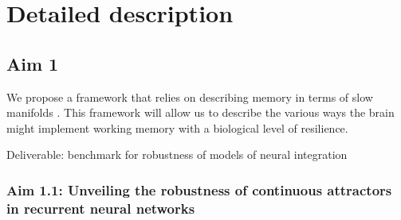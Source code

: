 \documentclass[12pt,letterpaper, onecolumn]{article}
\theoremstyle{definition}
\theoremstyle{remark}
\begin{document}



\newpage
\section{Detailed description}
\subsection*{Aim 1}
We propose a framework that relies on describing memory in terms of slow manifolds \citep{ghazizadeh2021slow}. %
This framework will allow us to describe the various ways the brain might implement working memory with a biological level of resilience.

\noindent
Deliverable: benchmark for robustness of models of neural integration

\subsubsection*{Aim 1.1: Unveiling the robustness of continuous attractors in recurrent neural networks}

\end{document}

